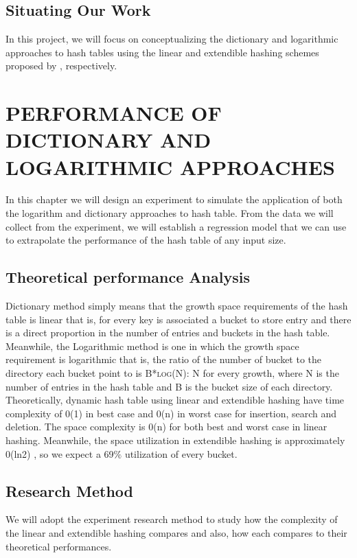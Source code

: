 \documentclass[a4paper,12pt, openany]{book}
\begin{document}
\section{Situating Our Work}
In this project, we will focus on conceptualizing the dictionary and logarithmic approaches to hash tables using the linear and extendible hashing schemes proposed by \cite{larson1989dynamic}, \cite{vitter2008algorithms} respectively.


\chapter{PERFORMANCE OF DICTIONARY AND LOGARITHMIC APPROACHES }
\label{chap:PERFORMANCE OF DICTIONARY AND LOGARITHMIC APPROACHES}
In this chapter we will design an experiment to simulate the application of both the logarithm and dictionary approaches to hash table. From the data we will collect from the experiment, we will establish a regression model that we can use to extrapolate the performance of the hash table of any input size.  

\section{Theoretical performance Analysis}
Dictionary method simply means that the growth space requirements of the hash table is linear that is, for every key is associated a bucket to store entry and there is a direct proportion in the number of entries and buckets in the hash table. Meanwhile, the  Logarithmic method is one in which the growth space requirement is logarithmic that is, the ratio of the number of bucket  to the directory each bucket point to  is  \textsc{B*log(N): N} for every growth, where N is the number of entries in the hash table and B is the bucket size of each directory.\bigbreak
Theoretically, dynamic hash table using linear and extendible hashing have time complexity of 0(1) in best case and 0(n) in worst case for insertion, search and deletion. The space complexity is 0(n) for both best and worst case in linear hashing. Meanwhile, the space utilization in extendible hashing is approximately 0(ln2) \cite{article}, so we expect a 69$\%$ utilization of every bucket. 
 

\section{Research Method}
We will adopt the experiment research method to study how the complexity of the linear and extendible hashing compares and also, how each compares to their theoretical performances.
\end{document}
